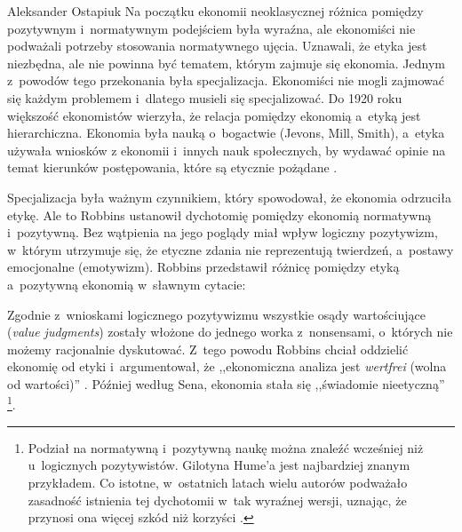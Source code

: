 \begin{artplenv}{Aleksander Ostapiuk}
Na początku ekonomii neoklasycznej różnica pomiędzy pozytywnym i~normatywnym podejściem była wyraźna, ale ekonomiści nie
podważali potrzeby stosowania normatywnego ujęcia. Uznawali, że etyka jest niezbędna, ale nie powinna być tematem,
którym zajmuje się ekonomia. Jednym z~powodów tego przekonania była specjalizacja. Ekonomiści nie mogli zajmować się
każdym problemem i~dlatego musieli się specjalizować. Do 1920 roku większość ekonomistów wierzyła, że relacja pomiędzy
ekonomią a~etyką jest hierarchiczna. Ekonomia była nauką o~bogactwie (Jevons, Mill, Smith), a~etyka używała wniosków z
ekonomii i~innych nauk społecznych, by wydawać opinie na temat kierunków postępowania, które są etycznie pożądane
\parencite{yuengert_positive-normative_2000}.

Specjalizacja była ważnym czynnikiem, który spowodował, że ekonomia odrzuciła etykę. Ale to Robbins ustanowił dychotomię
pomiędzy ekonomią normatywną i~pozytywną. Bez wątpienia na jego poglądy miał wpływ logiczny pozytywizm, w~którym
utrzymuje się, że etyczne zdania nie reprezentują twierdzeń, a~postawy emocjonalne (emotywizm). Robbins
przedstawił różnicę pomiędzy etyką a~pozytywną ekonomią w~sławnym cytacie:


Zgodnie z~wnioskami logicznego pozytywizmu wszystkie osądy wartościujące (\textit{value judgments}) zostały włożone do
jednego worka z~nonsensami, o~których nie możemy racjonalnie dyskutować. Z~tego powodu Robbins chciał oddzielić
ekonomię od etyki i~argumentował, że ,,ekonomiczna analiza jest \textit{wertfrei }(wolna od wartości)''
\parencite[s.~91]{robbins_essay_1935}.
Później według Sena, ekonomia stała się ,,świadomie nieetyczną''
\parencite[s.~2]{sen_ethics_1987}\footnote{Podział na normatywną i~pozytywną naukę można znaleźć wcześniej niż
u~logicznych pozytywistów. Gilotyna Hume'a jest najbardziej znanym przykładem. Co istotne, w~ostatnich latach wielu
autorów podważało zasadność istnienia tej dychotomii w~tak wyraźnej wersji, uznając, że przynosi ona więcej szkód niż
korzyści
\parencite{blaug_metodologia_1995,putnam_collapse_2002,mongin_value_2006,czarny_pozytywizm_2010}.
}. 


\end{artplenv}
